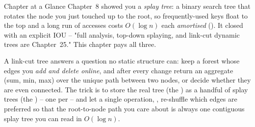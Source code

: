 
\begin{chaptertheorybox}{Chapter at a Glance}
Chapter~8 showed you a \emph{splay tree}: a binary search tree that rotates the
node you just touched up to the root, so frequently-used keys float to the top and
a long run of accesses costs \(O(\log n)\) each \emph{amortised} ().
It closed with an explicit IOU -- "full analysis, top-down splaying, and link-cut
dynamic trees are Chapter~25."  This chapter pays all three.

A link-cut tree answers a question no static structure can: keep a forest whose
edges you \emph{add and delete online}, and after every change return an aggregate
(sum, min, max) over the unique path between two nodes, or decide whether they are
even connected.  The trick is to store the real tree (the )
as a handful of splay trees (the ) -- one per  -- and let a single operation, , re-shuffle which edges are
preferred so that the root-to-node path you care about is always one contiguous
splay tree you can read in \(O(\log n)\).


\end{chaptertheorybox}
